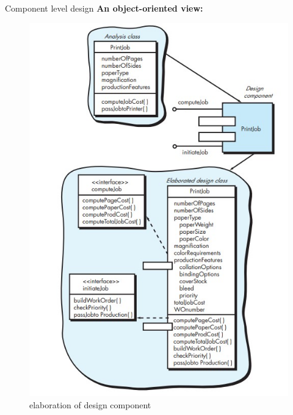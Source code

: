 \documentclass{beamer}
\begin{document}
\begin{frame}{Component level design }
	\textbf{An object-oriented view:}
	\begin{figure}
	\includegraphics[scale=.46]{img/m2_46.jpg}
	\caption{elaboration of design component
	}
\end{figure}
\end{frame}

	
\end{document}

